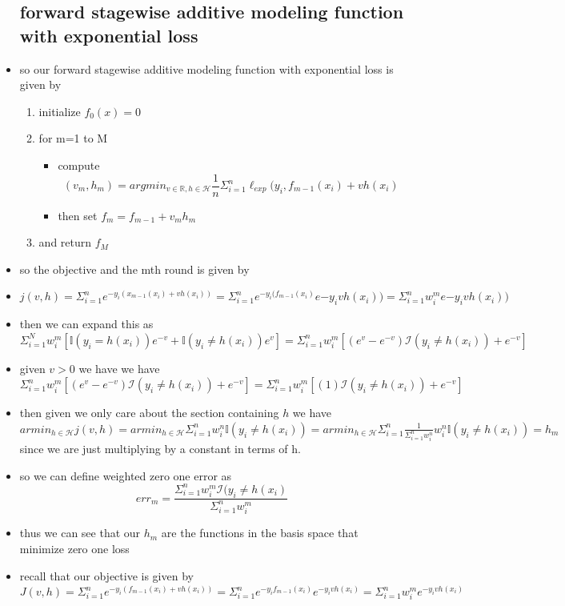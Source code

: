 \documentclass{article}
\begin{document}
\begin{itemize}
\subsection{forward stagewise additive modeling function with exponential loss}
\item so our forward stagewise additive modeling function with exponential loss is given by 
\begin{enumerate}
    \item initialize $f_0(x)=0$
    \item for m=1 to M
    \begin{itemize}
        \item compute $$(v_m,h_m)=argmin_{v\in \mathbb{R}, h\in \mathcal{H}}\frac{1}{n}\Sigma_{i=1}^{n}\ell_{exp}(y_i,f_{m-1}(x_i)+vh(x_i)$$
        \item then set $f_{m}=f_{m-1}+v_mh_m$
    \end{itemize}
    \item and return $f_M$
\end{enumerate}
\item so the objective and the mth round is given by 
\item $j(v,h)=\Sigma_{i=1}^{n}e^{-y_i(x_{m-1}(x_i)+vh(x_i))}=\Sigma_{i=1}^{n}e^{-y_i(f_{m-1}(x_i)}e{-y_ivh(x_i))}=\Sigma_{i=1}^{n}w_{i}^{m}e{-y_ivh(x_i))}$
\item then we can expand this as $\Sigma_{i=1}^{N}w_{i}^{m}[\mathbb{I}(y_i=h(x_i))e^{-v}+\mathbb{I}(y_i\neq h(x_i))e^{v}]=\Sigma_{i=1}^{n}w_i^m[(e^{v}-e^{-v})\mathcal{I}(y_i\neq h(x_i) )+e^{-v}]$
\item given $v>0$ we have 
we have $\Sigma_{i=1}^{n}w_i^m[(e^{v}-e^{-v})\mathcal{I}(y_i\neq h(x_i) )+e^{-v}]=\Sigma_{i=1}^{n}w_i^m[(1)\mathcal{I}(y_i\neq h(x_i) )+e^{-v}]$
\item then given we only care about the section containing $h$
we have$armin_{h\in \mathcal{H}}j(v,h)=armin_{h\in \mathcal{H}}\Sigma_{i=1}^{n}w_{i}^{n}\mathbb{I}(y_i\neq h(x_i))=armin_{h\in \mathcal{H}}\Sigma_{i=1}^{n}\frac{1}{\Sigma_{i=1}^{n}w_i^{n}}w_{i}^{n}\mathbb{I}(y_i\neq h(x_i))=h_m$ since we are just multiplying by a constant in terms of h. 
\item so we can define weighted zero one error as $$err_{m}=\frac{\Sigma_{i=1}^{n}w_{i}^{m}\mathcal{I}(y_i\neq h(x_i)}{\Sigma_{i=1}^{n}w_i^m}$$ 
\item thus we can see that our $h_m$ are the functions in the basis space that minimize zero one loss
\item recall that our objective is given by $J(v,h)=\Sigma_{i=1}^{n}e^{-y_{i}(f_{m-1}(x_i)+vh(x_i))}=\Sigma_{i=1}^{n}e^{-y_if_{m-1}(x_i)}e^{-y_{i}vh(x_i)}=\Sigma_{i=1}^{n}w_{i}^{m}e^{-y_{i}vh(x_i)}$

\end{itemize}
\end{document}
